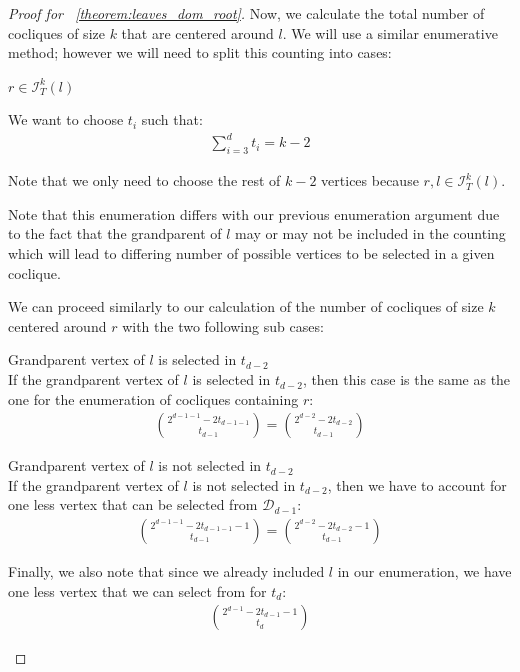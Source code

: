 \documentclass{amsart}
\theoremstyle{definition}
\begin{document}
\begin{proof}[Proof for ~\ref{theorem:leaves_dom_root}]
	Now, we calculate the total number of cocliques of size $k$ that are centered around $l$. We will use a similar enumerative method; however we will need to split this counting into cases:

	\begin{caseof}
		\item $r \in \mathcal{I}^k_T(l)$

		We want to choose $t_i$ such that:
		\begin{align*}
			\displaystyle\sum_{i = 3}^{d}t_i = k - 2
		\end{align*}

		Note that we only need to choose the rest of $k - 2$ vertices because $r, l \in \mathcal{I}^k_T(l)$.

		Note that this enumeration differs with our previous enumeration argument due to the fact that the grandparent of $l$ may or may not be included in the counting which will lead to differing number of possible vertices to be selected in a given coclique.

		We can proceed similarly to our calculation of the number of cocliques of size $k$ centered around $r$ with the two following sub cases:

		\begin{subcaseof}
			\item Grandparent vertex of $l$ is selected in $t_{d - 2}$\\
			If the grandparent vertex of $l$ is selected in $t_{d - 2}$, then this case is the same as the one for the enumeration of cocliques containing $r$:
			\begin{align*}
				\binom{2^{d - 1 - 1} - 2t_{d - 1 - 1}}{t_{d - 1}} = \binom{2^{d - 2} - 2t_{d - 2}}{t_{d - 1}}
			\end{align*}
			\item Grandparent vertex of $l$ is not selected in $t_{d - 2}$ \\
			If the grandparent vertex of $l$ is not selected in $t_{d - 2}$, then we have to account for one less vertex that can be selected from $\mathcal{D}_{d - 1}$:
			\begin{align*}
				\binom{2^{d - 1 - 1} - 2t_{d - 1 - 1} - 1}{t_{d - 1}} = \binom{2^{d - 2} - 2t_{d - 2} - 1}{t_{d - 1}}
			\end{align*}
		\end{subcaseof}

		Finally, we also note that since we already included $l$ in our enumeration, we have one less vertex that we can select from for $t_d$:
		\begin{align*}
			\binom{2^{d - 1} - 2t_{d - 1} - 1}{t_d}
		\end{align*}


\end{caseof}
\end{proof}
\end{document}
